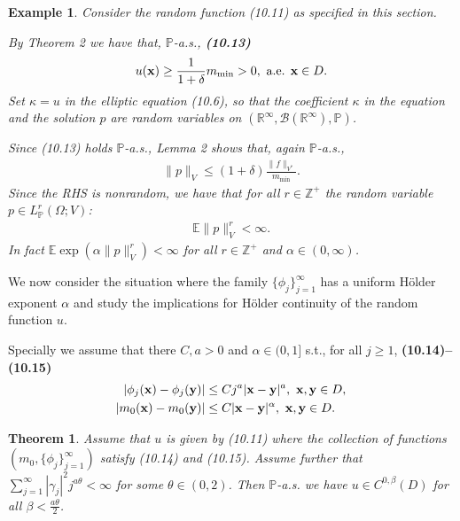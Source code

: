 \documentclass[oneside,11pt]{book}
\numberwithin{equation}{section}
\newtheorem{theorem}{Theorem}[section]
\newtheorem{example}{Example}[section]
\begin{document}
\begin{example}
    Consider the random function (10.11) as specified in this section.
    
    By Theorem 2 we have that, $\mathbb{P}$-a.s., \textbf{(10.13)}
    \begin{align*}
        u({\bf x})\ge\frac{1}{1 + \delta}m_{\min} > 0, \mbox{ a.e. } {\bf x}\in D.
    \end{align*}
    Set $\kappa = u$ in the elliptic equation (10.6), so that the coefficient $\kappa$ in the equation and the solution $p$ are random variables on $(\mathbb{R}^\infty,\mathcal{B}(\mathbb{R}^\infty),\mathbb{P})$.
    
    Since (10.13) holds $\mathbb{P}$-a.s., Lemma 2 shows that, again $\mathbb{P}$-a.s.,
    \begin{align*}
        \|p\|_V\le(1 + \delta)\frac{\|f\|_{V^*}}{m_{\min}}.
    \end{align*}
    Since the RHS is nonrandom, we have that for all $r\in\mathbb{Z}^+$ the random variable $p\in L_{\mathbb{P}}^r(\Omega;V)$:
    \begin{align*}
        \mathbb{E}\|p\|_V^r < \infty.
    \end{align*}
    In fact $\mathbb{E}\exp(\alpha\|p\|_V^r) < \infty$ for all $r\in\mathbb{Z}^+$ and $\alpha\in(0,\infty)$.
\end{example}
We now consider the situation where the family $\{\phi_j\}_{j=1}^\infty$ has a uniform H\"older exponent $\alpha$ and study the implications for H\"older continuity of the random function $u$.

Specially we assume that there $C,a > 0$ and $\alpha\in(0,1]$ s.t., for all $j\ge 1$, \textbf{(10.14)--(10.15)}
\begin{align*}
    |\phi_j({\bf x}) - \phi_j({\bf y})|&\le Cj^a|{\bf x} - {\bf y}|^a,\ {\bf x},{\bf y}\in D,\\
    |m_0({\bf x}) - m_0({\bf y})|&\le C|{\bf x} - {\bf y}|^\alpha,\ {\bf x},{\bf y}\in D.
\end{align*}

\begin{theorem}
    Assume that $u$ is given by (10.11) where the collection of functions $(m_0,\{\phi_j\}_{j=1}^\infty)$ satisfy (10.14) and (10.15). Assume further that $\sum_{j=1}^\infty |\gamma_j|^2j^{a\theta} < \infty$ for some $\theta\in(0,2)$. Then $\mathbb{P}$-a.s. we have $u\in C^{0,\beta}(D)$ for all $\beta < \frac{a\theta}{2}$.
\end{theorem}
\end{document}

